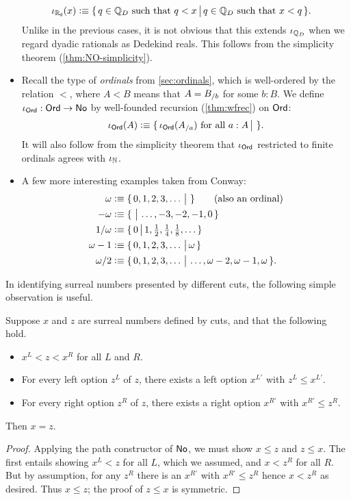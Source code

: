 \begin{itemize}
  \begin{align*}
    \iota_{\mathbb{R}_\mathsf{d}}(x) &\vcentcolon\equiv
    \{\,q\in\mathbb{Q}_D \text{ such that } q<x\,\big|\,q\in\mathbb{Q}_D \text{ such that } x<q\,\}.
  \end{align*}
  Unlike in the previous cases, it is not obvious that this extends $\iota_{\mathbb{Q}_D}$ when we regard dyadic rationals as Dedekind reals.
  This follows from the simplicity theorem (\autoref{thm:NO-simplicity}).
\item Recall the type \ord of \emph{ordinals} from \autoref{sec:ordinals}, which is well-ordered by the relation $<$, where $A<B$ means that $A = {B}_{/b}$ for some $b:B$.
  We define $\iota_{\mathsf{Ord}}:\mathsf{Ord}\to\mathsf{No}$ by well-founded recursion (\autoref{thm:wfrec}) on $\mathsf{Ord}$:
  \begin{equation*}
    \iota_{\mathsf{Ord}}(A) \vcentcolon\equiv
    \{\,\iota_\mathsf{Ord}({A}_{/a}) \text{ for all } a:A\,\big|\,\,\}.
  \end{equation*}
  It will also follow from the simplicity theorem that $\iota_\mathsf{Ord}$ restricted to finite ordinals agrees with $\iota_\mathbb{N}$.
\item A few more interesting examples taken from Conway:
  \begin{align*}
    \omega &\vcentcolon\equiv \{\,0,1,2,3,\dots\,\big|\,\,\} \qquad\text{(also an ordinal)}\\
    -\omega &\vcentcolon\equiv \{\,\,\big|\,\dots,-3,-2,-1,0\,\}\\
    1/\omega &\vcentcolon\equiv \textstyle\{\,0\,\big|\,1,\frac12,\frac14,\frac18,\dots\,\}\\
    \omega-1 &\vcentcolon\equiv \{\,0,1,2,3,\dots\,\big|\,\omega\,\}\\
    \omega/2 &\vcentcolon\equiv \{\,0,1,2,3,\dots\,\big|\,\dots,\omega-2,\omega-1,\omega\,\}.
  \end{align*}
\end{itemize}

In identifying surreal numbers presented by different cuts, the following simple observation is useful.

\begin{thm}\label{thm:NO-simplicity}
  Suppose $x$ and $z$ are surreal numbers defined by cuts, and that the following hold.
  \begin{itemize}
  \item $x^L < z < x^R$ for all $L$ and $R$.
  \item For every left option $z^L$ of $z$, there exists a left option $x^{L'}$ with $z^L\le x^{L'}$.
  \item For every right option $z^R$ of $z$, there exists a right option $x^{R'}$ with $x^{R'}\le z^R$.
  \end{itemize}
  Then $x=z$.
\end{thm}
\begin{proof}
  Applying the path constructor of $\mathsf{No}$, we must show $x\le z$ and $z\le x$.
  The first entails showing $x^L<z$ for all $L$, which we assumed, and $x<z^R$ for all $R$.
  But by assumption, for any $z^R$ there is an $x^{R'}$ with $x^{R'}\le z^R$ hence $x<z^R$ as desired.
  Thus $x\le z$; the proof of $z\le x$ is symmetric.
\end{proof}

